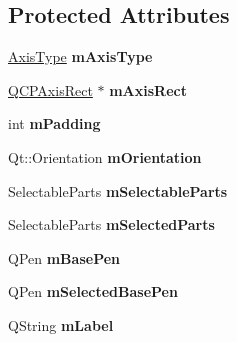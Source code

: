 \subsection*{Protected Attributes}
\begin{DoxyCompactItemize}
\item 
\hyperlink{class_q_c_p_axis_ae2bcc1728b382f10f064612b368bc18a}{Axis\+Type} {\bfseries m\+Axis\+Type}\hypertarget{class_q_c_p_axis_ae704bf9f2c2b026f08dd4ccad79c616e}{}\label{class_q_c_p_axis_ae704bf9f2c2b026f08dd4ccad79c616e}

\item 
\hyperlink{class_q_c_p_axis_rect}{Q\+C\+P\+Axis\+Rect} $\ast$ {\bfseries m\+Axis\+Rect}\hypertarget{class_q_c_p_axis_a6f150b65a202f32936997960e331dfcb}{}\label{class_q_c_p_axis_a6f150b65a202f32936997960e331dfcb}

\item 
int {\bfseries m\+Padding}\hypertarget{class_q_c_p_axis_a52a805a4f03231210e0880db7f77e098}{}\label{class_q_c_p_axis_a52a805a4f03231210e0880db7f77e098}

\item 
Qt\+::\+Orientation {\bfseries m\+Orientation}\hypertarget{class_q_c_p_axis_a048e1792fa86f4f86df55200b3f0be36}{}\label{class_q_c_p_axis_a048e1792fa86f4f86df55200b3f0be36}

\item 
Selectable\+Parts {\bfseries m\+Selectable\+Parts}\hypertarget{class_q_c_p_axis_ab9042d8a095998f27a28b39411d8b9c3}{}\label{class_q_c_p_axis_ab9042d8a095998f27a28b39411d8b9c3}

\item 
Selectable\+Parts {\bfseries m\+Selected\+Parts}\hypertarget{class_q_c_p_axis_a8f1eb0abfe2ae64652aa46b360e841e4}{}\label{class_q_c_p_axis_a8f1eb0abfe2ae64652aa46b360e841e4}

\item 
Q\+Pen {\bfseries m\+Base\+Pen}\hypertarget{class_q_c_p_axis_ad6b4a0aee9558fb35529e960b8fef72d}{}\label{class_q_c_p_axis_ad6b4a0aee9558fb35529e960b8fef72d}

\item 
Q\+Pen {\bfseries m\+Selected\+Base\+Pen}\hypertarget{class_q_c_p_axis_a80baa4e3c16f9b6edf3eccacd2a50fde}{}\label{class_q_c_p_axis_a80baa4e3c16f9b6edf3eccacd2a50fde}

\item 
Q\+String {\bfseries m\+Label}\hypertarget{class_q_c_p_axis_ae8001dbdfc47685c1cf7b98b044460e6}{}\label{class_q_c_p_axis_ae8001dbdfc47685c1cf7b98b044460e6}


\end{DoxyCompactItemize}
